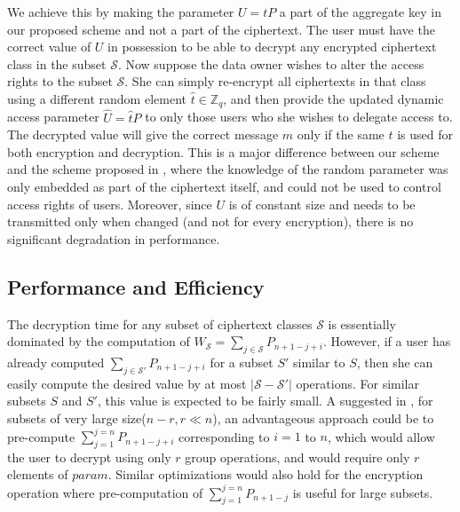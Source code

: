 We achieve this by making the parameter $U=tP$ a part of the aggregate key in our proposed scheme and not a part of the ciphertext. The user must have the correct value of $U$ in possession to be able to decrypt any encrypted ciphertext class in the subset $\mathcal{S}$. Now suppose the data owner wishes to alter the access rights to the subset $\mathcal{S}$. She can simply re-encrypt all ciphertexts in that class using a different random element $\hat{t}\in\mathbb{Z}_q$, and then provide the updated dynamic access parameter $\hat{U}=\hat{t}P$ to only those users who she wishes to delegate access to. The decrypted value will give the correct message $m$ only if the same $t$ is used for both encryption and decryption. This is a major difference between our scheme and the scheme proposed in \cite{chu2014key}, where the knowledge of the random parameter was only embedded as part of the ciphertext itself, and could not be used to control access rights of users. Moreover, since $U$ is of constant size and needs to be transmitted only when changed (and not for every encryption), there is no significant degradation in performance.

\subsection{Performance and Efficiency}
\label{subsec:perf}
The decryption time for any subset of ciphertext classes $\mathcal{S}$ is essentially dominated by the computation of $W_{\mathcal{S}}=\sum_{j\in\mathcal{S}}P_{n+1-j+i}$. However, if a user has already computed $\sum_{j\in\mathcal{S}'}P_{n+1-j+i}$ for a subset $S'$ similar to $S$, then she can easily compute the desired value by at most $|\mathcal{S}-\mathcal{S}'|$ operations. For similar subsets $S$ and $S'$, this value is expected to be fairly small. A suggested in \cite{boneh2005collusion}, for subsets of very large size($n-r, r\ll n$), an advantageous approach could be to pre-compute $\sum_{j=1}^{j=n}P_{n+1-j+i}$ corresponding to $i=1$ to $n$, which would allow the user to decrypt using only $r$ group operations, and would require only $r$ elements of $param$. Similar optimizations would also hold for the encryption operation where pre-computation of  $\sum_{j=1}^{j=n}P_{n+1-j}$ is useful for large subsets.

